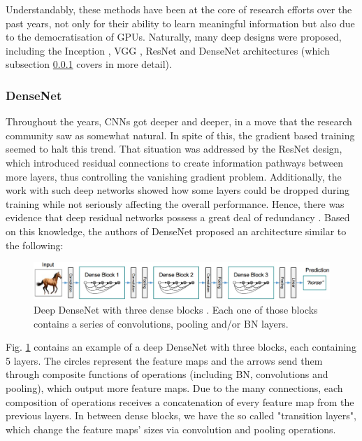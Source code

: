 Understandably, these methods have been at the core of research efforts over the past years, not only for their ability to learn meaningful information but also due to the democratisation of \ac{GPU}s. Naturally, many deep designs were proposed, including the Inception \cite{inception}, VGG \cite{vgg}, ResNet \cite{resnet} and DenseNet \cite{densenet} architectures (which subsection \ref{subsubsec:chap2_densenet} covers in more detail).

\subsubsection{DenseNet}
\label{subsubsec:chap2_densenet}

Throughout the years, \ac{CNN}s got deeper and deeper, in a move that the research community saw as somewhat natural. In spite of this, the gradient based training seemed to halt this trend. That situation was addressed by the ResNet design, which introduced residual connections to create information pathways between more layers, thus controlling the vanishing gradient problem. Additionally, the work with such deep networks showed how some layers could be dropped during training while not seriously affecting the overall performance. Hence, there was evidence that deep residual networks possess a great deal of redundancy \cite{densenet, deep_residual}. Based on this knowledge, the authors of DenseNet proposed an architecture similar to the following: \\

\begin{figure}[h]
\centering
\includegraphics[width=390pt]{figures/figure_3.pdf}
\caption{Deep DenseNet with three dense blocks \cite{densenet}. Each one of those blocks contains a series of convolutions, pooling and/or \ac{BN} layers.}
\label{fig:densenet}
\end{figure}

Fig. \ref{fig:densenet} contains an example of a deep DenseNet with three blocks, each containing 5 layers. The circles represent the feature maps and the arrows send them through composite functions of operations (including \ac{BN}, convolutions and pooling), which output more feature maps. Due to the many connections, each composition of operations receives a concatenation of every feature map from the previous layers. In between dense blocks, we have the so called "transition layers", which change the feature maps' sizes via convolution and pooling operations. 

